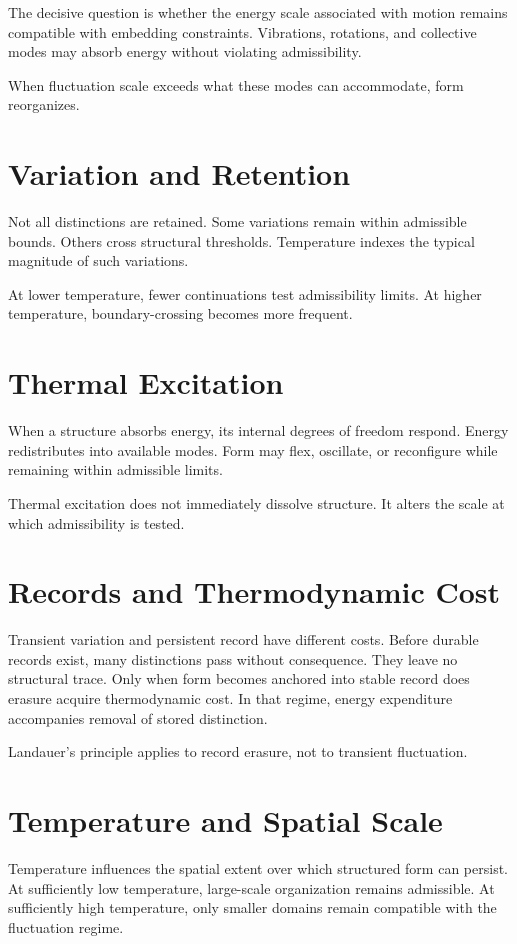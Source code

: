 \documentclass[11pt,twoside,openright]{book}
\begin{document}
The decisive question is whether the energy scale associated with motion remains compatible with embedding constraints. Vibrations, rotations, and collective modes may absorb energy without violating admissibility.

When fluctuation scale exceeds
what these modes can accommodate,
form reorganizes.
\section*{Variation and Retention}

Not all distinctions are retained. Some variations remain within admissible bounds. Others cross structural thresholds. Temperature indexes the typical magnitude of such variations.

At lower temperature,
fewer continuations test admissibility limits.
At higher temperature,
boundary-crossing becomes more frequent.
\section*{Thermal Excitation}

When a structure absorbs energy, its internal degrees of freedom respond. Energy redistributes into available modes. Form may flex, oscillate, or reconfigure while remaining within admissible limits.

Thermal excitation does not immediately dissolve structure.
It alters the scale at which admissibility is tested.
\section*{Records and Thermodynamic Cost}

Transient variation and persistent record have different costs. Before durable records exist, many distinctions pass without consequence. They leave no structural trace. Only when form becomes anchored into stable record does erasure acquire thermodynamic cost. In that regime, energy expenditure accompanies removal of stored distinction.

Landauer's principle applies to record erasure,
not to transient fluctuation.
\section*{Temperature and Spatial Scale}

Temperature influences the spatial extent over which structured form can persist. At sufficiently low temperature, large-scale organization remains admissible. At sufficiently high temperature, only smaller domains remain compatible with the fluctuation regime.
\end{document}
